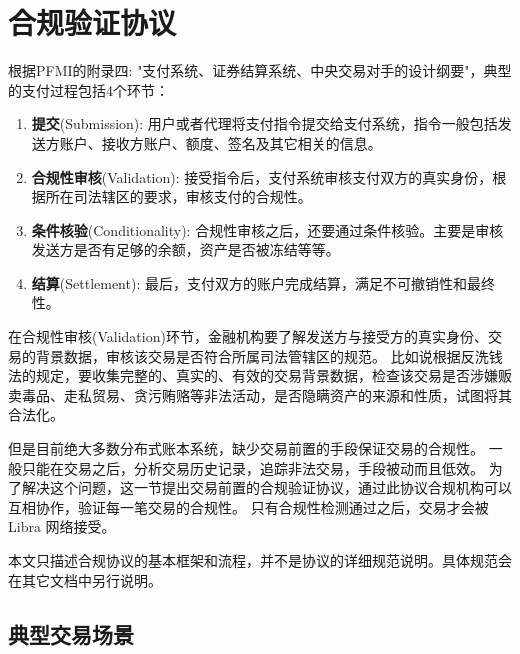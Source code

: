 \section{合规验证协议}\label{sec:compliance}
根据PFMI\cite{pfmi}的附录四: "支付系统、证券结算系统、中央交易对手的设计纲要"，典型的支付过程包括4个环节：
\begin{enumerate}
    \item \textbf{提交}(Submission): 用户或者代理将支付指令提交给支付系统，指令一般包括发送方账户、接收方账户、额度、签名及其它相关的信息。
    \item \textbf{合规性审核}(Validation): 接受指令后，支付系统审核支付双方的真实身份，根据所在司法辖区的要求，审核支付的合规性。
    \item \textbf{条件核验}(Conditionality): 合规性审核之后，还要通过条件核验。主要是审核发送方是否有足够的余额，资产是否被冻结等等。
    \item \textbf{结算}(Settlement): 最后，支付双方的账户完成结算，满足不可撤销性和最终性。
\end{enumerate}

在合规性审核(Validation)环节，金融机构要了解发送方与接受方的真实身份、交易的背景数据，审核该交易是否符合所属司法管辖区的规范。
比如说根据反洗钱法的规定，要收集完整的、真实的、有效的交易背景数据，检查该交易是否涉嫌贩卖毒品、走私贸易、贪污贿赂等非法活动，是否隐瞒资产的来源和性质，试图将其合法化。

但是目前绝大多数分布式账本系统，缺少交易前置的手段保证交易的合规性。
一般只能在交易之后，分析交易历史记录，追踪非法交易，手段被动而且低效。
为了解决这个问题，这一节提出交易前置的合规验证协议，通过此协议合规机构可以互相协作，验证每一笔交易的合规性。
只有合规性检测通过之后，交易才会被 Libra 网络接受。

本文只描述合规协议的基本框架和流程，并不是协议的详细规范说明。具体规范会在其它文档中另行说明。


\subsection{典型交易场景}

